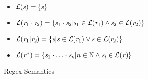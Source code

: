 \begin{figure}

\begin{itemize}
\item $\mathcal{L}{}(\mathit{s})=\{\mathit{s}\}$
\item $\mathcal{L}{}(\mathit{r}_1\cdot\mathit{r}_2) =
\{\mathit{s}_1\cdot\mathit{s}_2 | \mathit{s}_1\in\mathcal{L}{}(\mathit{r}_1) \wedge \mathit{s}_2\in\mathcal{L}{}(\mathit{r}_2)\}$
\item $\mathcal{L}{}(\mathit{r}_1|\mathit{r}_2) =
\{\mathit{s} | \mathit{s}\in\mathcal{L}{}(\mathit{r}_1) \vee \mathit{s}\in\mathcal{L}{}(\mathit{r}_2)\}$
\item $\mathcal{L}{}(\mathit{r}^*) =
\{\mathit{s}_1\cdot\ldots\cdot\mathit{s}_n | n\in\mathbb{N} \wedge \mathit{s}_i\in\mathcal{L}{}(\mathit{r})\}$

\end{itemize}
\caption{Regex Semantics}
\label{fig:regex-semantics}
\end{figure}
